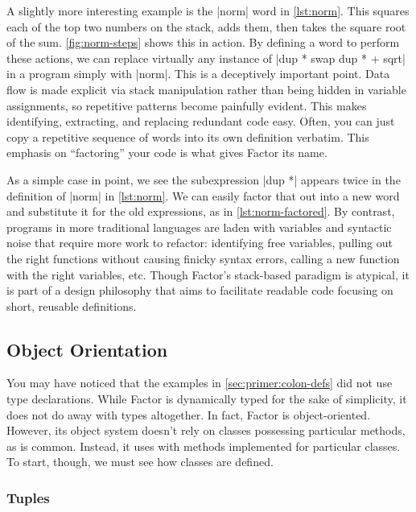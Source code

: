 A slightly more interesting example is the \factor|norm| word in
\cref{lst:norm}.  This squares each of the top two numbers on the stack, adds
them, then takes the square root of the sum.  \cref{fig:norm-steps} shows this
in action.  By defining a word to perform these actions, we can replace
virtually any instance of
%
\factor|dup * swap dup * + sqrt|
%
in a program simply with \factor|norm|.  This is a deceptively important point.
Data flow is made explicit via stack manipulation rather than being hidden in
variable assignments, so repetitive patterns become painfully evident.  This
makes identifying, extracting, and replacing redundant code easy.  Often, you
can just copy a repetitive sequence of words into its own definition verbatim.
This emphasis on ``factoring'' your code is what gives Factor its name.


As a simple case in point, we see the subexpression \factor|dup *| appears
twice in the definition of \factor|norm| in \cref{lst:norm}.  We can easily
factor that out into a new word and substitute it for the old expressions, as
in \cref{lst:norm-factored}.  By contrast, programs in more traditional
languages are laden with variables and syntactic noise that require more work
to refactor: identifying free variables, pulling out the right functions
without causing finicky syntax errors, calling a new function with the right
variables, etc.  Though Factor's stack-based paradigm is atypical, it is part
of a design philosophy that aims to facilitate readable code focusing on short,
reusable definitions.

\subsection{Object Orientation}

You may have noticed that the examples in \cref{sec:primer:colon-defs} did not
use type declarations.  While Factor is dynamically typed for the sake of
simplicity, it does not do away with types altogether.  In fact, Factor is
object-oriented.  However, its object system doesn't rely on classes possessing
particular methods, as is common.  Instead, it uses  with
methods implemented for particular classes.  To start, though, we must see how
classes are defined.

\subsubsection{Tuples}

